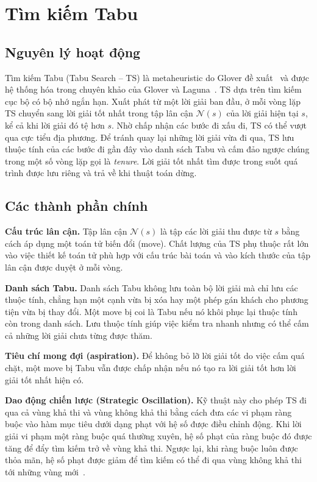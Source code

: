 \documentclass[../DoAn.tex]{subfiles}
\begin{document}
\section{Tìm kiếm Tabu}
\label{sec:tabusearch}

\subsection{Nguyên lý hoạt động}

Tìm kiếm Tabu (Tabu Search -- TS) là metaheuristic do Glover đề xuất~\cite{glover1986future} và được hệ thống hóa trong chuyên khảo của Glover và Laguna~\cite{glover1997tabu}. TS dựa trên tìm kiếm cục bộ có bộ nhớ ngắn hạn. Xuất phát từ một lời giải ban đầu, ở mỗi vòng lặp TS chuyển sang lời giải tốt nhất trong tập lân cận $\mathcal{N}(s)$ của lời giải hiện tại $s$, kể cả khi lời giải đó tệ hơn $s$. Nhờ chấp nhận các bước đi xấu đi, TS có thể vượt qua cực tiểu địa phương. Để tránh quay lại những lời giải vừa đi qua, TS lưu thuộc tính của các bước đi gần đây vào danh sách Tabu và cấm đảo ngược chúng trong một số vòng lặp gọi là \textit{tenure}. Lời giải tốt nhất tìm được trong suốt quá trình được lưu riêng và trả về khi thuật toán dừng.

\subsection{Các thành phần chính}

\textbf{Cấu trúc lân cận.} Tập lân cận $\mathcal{N}(s)$ là tập các lời giải thu được từ $s$ bằng cách áp dụng một toán tử biến đổi (move). Chất lượng của TS phụ thuộc rất lớn vào việc thiết kế toán tử phù hợp với cấu trúc bài toán và vào kích thước của tập lân cận được duyệt ở mỗi vòng.

\textbf{Danh sách Tabu.} Danh sách Tabu không lưu toàn bộ lời giải mà chỉ lưu các thuộc tính, chẳng hạn một cạnh vừa bị xóa hay một phép gán khách cho phương tiện vừa bị thay đổi. Một move bị coi là Tabu nếu nó khôi phục lại thuộc tính còn trong danh sách. Lưu thuộc tính giúp việc kiểm tra nhanh nhưng có thể cấm cả những lời giải chưa từng được thăm.

\textbf{Tiêu chí mong đợi (aspiration).} Để không bỏ lỡ lời giải tốt do việc cấm quá chặt, một move bị Tabu vẫn được chấp nhận nếu nó tạo ra lời giải tốt hơn lời giải tốt nhất hiện có.

\textbf{Dao động chiến lược (Strategic Oscillation).} Kỹ thuật này cho phép TS đi qua cả vùng khả thi và vùng không khả thi bằng cách đưa các vi phạm ràng buộc vào hàm mục tiêu dưới dạng phạt với hệ số được điều chỉnh động. Khi lời giải vi phạm một ràng buộc quá thường xuyên, hệ số phạt của ràng buộc đó được tăng để đẩy tìm kiếm trở về vùng khả thi. Ngược lại, khi ràng buộc luôn được thỏa mãn, hệ số phạt được giảm để tìm kiếm có thể đi qua vùng không khả thi tới những vùng mới~\cite{glover1997tabu, cordeau2001unified}.
\end{document}
